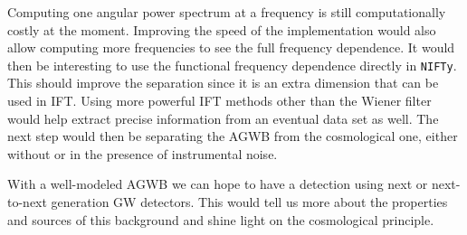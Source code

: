 Computing one angular power spectrum at a frequency is still computationally costly at the moment. Improving the speed of the implementation would also allow computing more frequencies to see the full frequency dependence. It would then be interesting to use the functional frequency dependence directly in {\tt NIFTy}. This should improve the separation since it is an extra dimension that can be used in IFT. Using more powerful IFT methods other than the Wiener filter would help extract precise information from an eventual data set as well. The next step would then be separating the AGWB from the cosmological one, either without or in the presence of instrumental noise.

With a well-modeled AGWB we can hope to have a detection using next or next-to-next generation GW detectors. This would tell us more about the properties and sources of this background and shine light on the cosmological principle.
